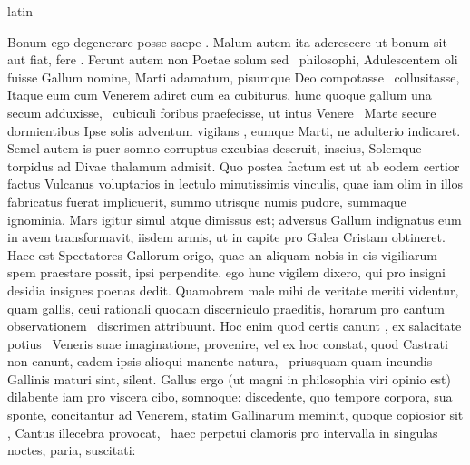 \documentclass[12pt]{book}
\renewenvironment{latin}
    	{\begin{hyphenrules}{latin}}
    	{\end{hyphenrules}}
\begin{document}
\begin{pages}
\begin{latin}
\begin{Leftside}
                    Bonum ego degenerare posse saepe . 
                    Malum autem ita adcrescere ut bonum sit aut fiat, fere . 
                    Ferunt autem non Poetae solum sed  \ampersand\ philosophi, Adulescentem oli fuisse Gallum nomine, Marti adamatum, pisumque Deo compotasse  \ampersand\ collusitasse, 
                    Itaque eum cum Venerem adiret cum ea cubiturus, hunc quoque gallum una secum adduxisse,  \ampersand\ cubiculi foribus praefecisse, ut intus Venere  \ampersand\ Marte secure dormientibus 
                    Ipse solis adventum vigilans , eumque  Marti, ne adulterio  indicaret. 
                    Semel autem is puer somno corruptus excubias deseruit, inscius, Solemque  torpidus ad Divae thalamum admisit. 
                    Quo postea factum est ut ab eodem certior factus Vulcanus voluptarios in lectulo minutissimis vinculis, quae iam olim in illos fabricatus fuerat implicuerit, summo utrisque numis pudore, summaque ignominia.  
                     Mars igitur simul atque dimissus est; 
                    adversus Gallum indignatus eum in avem transformavit, iisdem armis, ut in capite pro Galea Cristam obtineret. 
                    Haec est Spectatores Gallorum origo, quae an aliquam nobis in eis vigiliarum spem praestare possit, ipsi perpendite. 
                     ego hunc  vigilem dixero, qui pro insigni desidia insignes poenas dedit. 
                    Quamobrem male mihi de veritate meriti videntur, quam gallis, ceui rationali quodam discerniculo praeditis, horarum pro cantum observationem  \ampersand\ discrimen attribuunt. 
                    Hoc enim quod certis canunt , ex salacitate potius  \ampersand\ Veneris suae imaginatione, provenire, vel ex hoc constat, 
                    quod Castrati non canunt, eadem ipsis alioqui manente natura,  \ampersand\ priusquam quam ineundis Gallinis maturi sint, silent. 
                    Gallus ergo (ut magni in philosophia viri opinio est) dilabente iam pro viscera cibo, somnoque: 
                    discedente, quo tempore corpora, sua sponte, concitantur ad Venerem, statim Gallinarum meminit, 
                    quoque copiosior sit , Cantus illecebra provocat,  \ampersand\ haec perpetui clamoris pro intervalla in singulas noctes, paria, suscitati: 

\end{Leftside}
\end{latin}
\end{pages}
\end{document}
